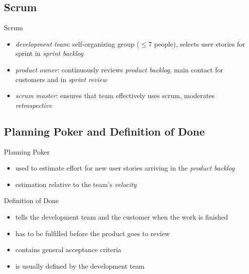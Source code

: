 \documentclass[
	aspectratio=169, %
	8pt, %
]{beamer}
\begin{document}
\subsection{Scrum}
\begin{frame}{\insertsubsection}
	\begin{fancycolumns}[widths={58}]
		\begin{exampletight}{}
			\diagramScrum
		\end{exampletight}
	\nextcolumn
		\begin{definition}{Scrum \mysource{\sommerville}}
			\begin{itemize}
				\item \emph{development team}: self-organizing group ($\leq 7$ people), selects user stories for sprint in \emph{sprint backlog}
				\item \emph{product owner}: continuously reviews \emph{product backlog}, main contact for customers and in \emph{sprint review}
				\item \emph{scrum master}: ensures that team effectively uses scrum, moderates \emph{retrospective}
			\end{itemize}
		\end{definition}
	\end{fancycolumns}
\end{frame}

\subsection{Planning Poker and Definition of Done}
\begin{frame}{\insertsubsection}
	\begin{fancycolumns}[t]
		\begin{note}{Planning Poker}
			\begin{itemize}
				\item used to estimate effort for new user stories arriving in the \emph{product backlog}
				\item estimation relative to the team's \emph{velocity}
			\end{itemize}
		\end{note}
		\centering{}
		\nextcolumn
		\begin{definition}{Definition of Done }
			\begin{itemize}
				\item tells the development team and the customer when the work is finished
				\item has to be fulfilled before the product goes to review
				\item contains general acceptance criteria
				\item is usually defined by the development team
			\end{itemize}
		\end{definition}
		\begin{center}
		\end{center}	
	\end{fancycolumns}
\end{frame}
\end{document}
